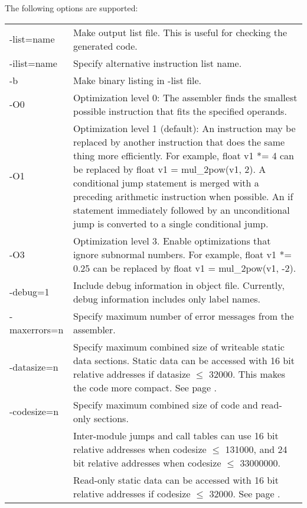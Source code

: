 \documentclass[forwardcom.tex]{subfiles}
\begin{document}
\vv
The following options are supported:\\
\begin{tabular}{|p{25mm}p{135mm}|}
\hline
-list=name & Make output list file. This is useful for checking the generated code.\\
-ilist=name & Specify alternative instruction list name.\\
-b         & Make binary listing in -list file. \\
-O0 & Optimization level 0: The assembler finds the smallest possible instruction that fits the specified operands. \\
-O1 & Optimization level 1 (default): An instruction may be replaced by another instruction that does the same thing more efficiently. For example, \linebreak
{\ttfamily float v1 *= 4} can be replaced by
 {\ttfamily float v1 = mul\_2pow(v1, 2)}. \linebreak
A conditional jump statement is merged with a preceding arithmetic instruction when possible.
 An {\ttfamily if} statement immediately followed by an
 unconditional jump is converted to a single conditional jump.\\
-O3 & Optimization level 3. Enable optimizations that ignore subnormal numbers. For example, {\ttfamily float v1 *= 0.25} can be replaced by {\ttfamily float v1 = mul\_2pow(v1, -2)}.\\
-debug=1  & Include debug information in object file. Currently, debug information includes only label names.\\
-maxerrors=n & Specify maximum number of error messages from the assembler.\\
-datasize=n & Specify maximum combined size of writeable static data sections. Static data can be accessed with 16 bit relative addresses if datasize $\leq$ 32000. 
This makes the code more compact. See page \pageref{SpecifyDataSize}.\\
-codesize=n & Specify maximum combined size of code and read-only sections. \\
           & Inter-module jumps and call tables can use 16 bit relative addresses when codesize $\leq$ 131000, and 24 bit relative addresses when codesize $\leq$ 33000000. \\
           & Read-only static data can be accessed with 16 bit relative addresses if codesize $\leq$ 32000. See page \pageref{SpecifyDataSize}.\\
\hline
\end{tabular}
\vv
\end{document}
